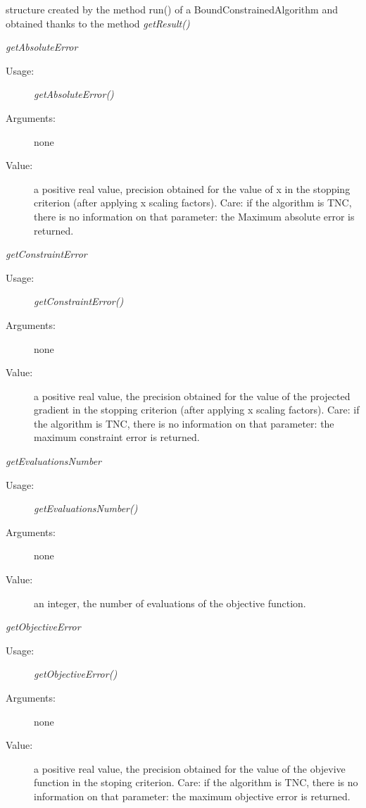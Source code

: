 \begin{description}
\item[Usage:] structure created by the method run() of a BoundConstrainedAlgorithm and obtained thanks to the method \textit{getResult()}

\item[Some methods:]  \rule{0pt}{1em}

  \begin{description}

  \item \textit{getAbsoluteError}
    \begin{description}
    \item[Usage:] \textit{getAbsoluteError()}
    \item[Arguments:] none
    \item[Value:] a positive real value, precision obtained for the value of x in the stopping criterion (after applying x scaling factors). Care: if the algorithm is TNC, there is no information on that parameter: the Maximum absolute error is returned.
    \end{description}
    \bigskip

  \item \textit{getConstraintError}
    \begin{description}
    \item[Usage:] \textit{getConstraintError()}
    \item[Arguments:] none
    \item[Value:] a positive real value, the precision obtained for the value of the projected gradient in the stopping criterion (after applying x scaling factors).  Care: if the algorithm is TNC, there is no information on that parameter: the maximum constraint error is returned.
    \end{description}
    \bigskip

  \item \textit{getEvaluationsNumber}
    \begin{description}
    \item[Usage:] \textit{getEvaluationsNumber()}
    \item[Arguments:] none
    \item[Value:] an integer, the  number of evaluations of the objective function.
    \end{description}
    \bigskip

  \item \textit{getObjectiveError}
    \begin{description}
    \item[Usage:] \textit{getObjectiveError()}
    \item[Arguments:] none
    \item[Value:] a positive real value, the precision obtained for the value of the objevive function in the stoping criterion. Care: if the algorithm is TNC, there is no information on that parameter: the maximum objective error is returned.
    \end{description}
    \bigskip


\end{description}
\end{description}
